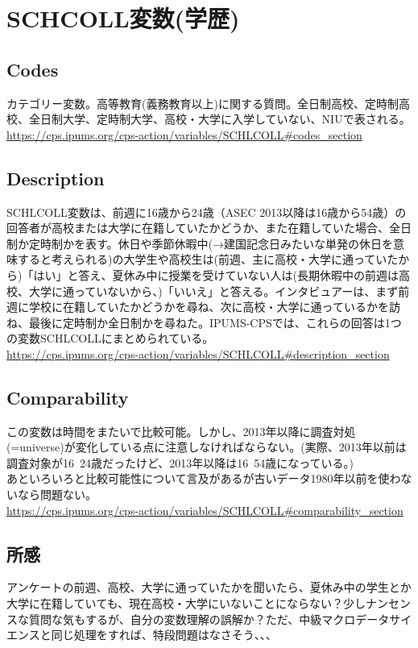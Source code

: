 \documentclass{jsarticle}
\begin{document}
\section{SCHCOLL変数(学歴)}

\subsection{Codes}
カテゴリー変数。高等教育(義務教育以上)に関する質問。全日制高校、定時制高校、全日制大学、定時制大学、高校・大学に入学していない、NIUで表される。\\
\url{https://cps.ipums.org/cps-action/variables/SCHLCOLL#codes_section}

\subsection{Description}
SCHLCOLL変数は、前週に16歳から24歳（ASEC 2013以降は16歳から54歳）の回答者が高校または大学に在籍していたかどうか、また在籍していた場合、全日制か定時制かを表す。休日や季節休暇中(→建国記念日みたいな単発の休日を意味すると考えられる)の大学生や高校生は(前週、主に高校・大学に通っていたから)「はい」と答え、夏休み中に授業を受けていない人は(長期休暇中の前週は高校、大学に通っていないから、)「いいえ」と答える。インタビュアーは、まず前週に学校に在籍していたかどうかを尋ね、次に高校・大学に通っているかを訪ね、最後に定時制か全日制かを尋ねた。IPUMS-CPSでは、これらの回答は1つの変数SCHLCOLLにまとめられている。\\
\url{https://cps.ipums.org/cps-action/variables/SCHLCOLL#description_section}

\subsection{Comparability}
この変数は時間をまたいで比較可能。しかし、2013年以降に調査対処(=universe)が変化している点に注意しなければならない。(実際、2013年以前は調査対象が16~24歳だったけど、2013年以降は16~54歳になっている。)\\
  
あといろいろと比較可能性について言及があるが古いデータ1980年以前を使わないなら問題ない。\\
\url{https://cps.ipums.org/cps-action/variables/SCHLCOLL#comparability_section}

\subsection{所感}
アンケートの前週、高校、大学に通っていたかを聞いたら、夏休み中の学生とか大学に在籍していても、現在高校・大学にいないことにならない？少しナンセンスな質問な気もするが、自分の変数理解の誤解か？ただ、中級マクロデータサイエンスと同じ処理をすれば、特段問題はなさそう、、、
\end{document}
